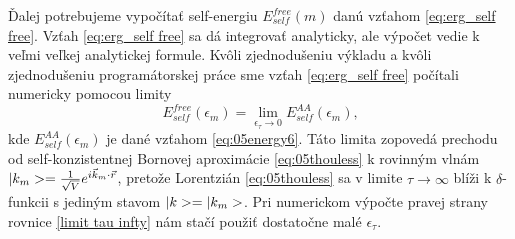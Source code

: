 Ďalej potrebujeme vypočítať self-energiu $E_{self}^{free}(m)$ danú vzťahom \eqref{eq:erg_self free}. Vzťah \eqref{eq:erg_self free} sa dá integrovať analyticky,
ale výpočet vedie k veľmi veľkej analytickej formule. Kvôli zjednodušeniu výkladu a kvôli zjednodušeniu programátorskej práce sme 
vzťah \eqref{eq:erg_self free} počítali numericky pomocou limity
\begin{equation}
\label{limit tau infty}
E_{self}^{free}(\epsilon_m) = \lim_{\epsilon_\tau \rightarrow 0} E_{self}^{AA}(\epsilon_m) \text{,}
\end{equation}
kde $E_{self}^{AA}(\epsilon_m)$ je dané vzťahom \eqref{eq:05energy6}. Táto limita  zopovedá prechodu od self-konzistentnej Bornovej aproximácie \eqref{eq:05thouless} k rovinným vlnám $|k_{m}>= \frac{1}{\sqrt V}e^{i\vec{k}_m\cdot\vec{r}}$, pretože Lorentzián \eqref{eq:05thouless} sa v limite $\tau \rightarrow \infty$ blíži k $\delta$-funkcii s jediným stavom
$|k> = |k_{m}>$. Pri numerickom výpočte pravej strany rovnice \eqref{limit tau infty} nám stačí použiť dostatočne  malé $\epsilon_\tau$. 

